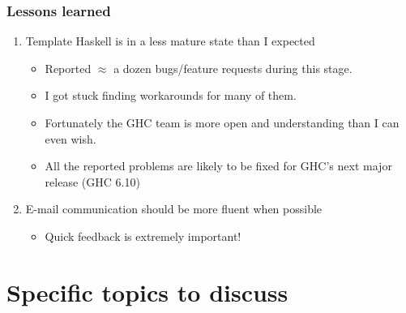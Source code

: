 \documentclass{beamer}
\begin{document}
\begin{frame}
  \frametitle{Lessons learned}
 \begin{enumerate}
 \item Template Haskell is in a less mature state than I expected
  \begin{itemize}
  \item Reported $\approx$ a dozen bugs/feature requests during this stage.
  \item I got stuck finding workarounds for many of them. 
  \item Fortunately the GHC team is more open and understanding than I can even wish.
  \item All the reported problems are likely to be fixed for GHC's next major release (GHC 6.10)
  \end{itemize}
  
 \item E-mail communication should be more fluent when possible
 \begin{itemize}
  \item Quick feedback is extremely important!
 \end{itemize}
 \end{enumerate}
\end{frame}

\section{Specific topics to discuss}
\end{document}
